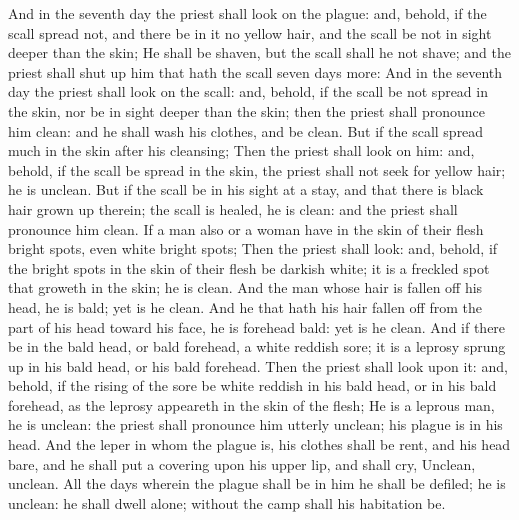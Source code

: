 \begin{biblechapter}
\verse And in the seventh day the priest shall look on the plague: and, behold, if the scall spread not, and there be in it no yellow hair, and the scall be not in sight deeper than the skin;
\verse He shall be shaven, but the scall shall he not shave; and the priest shall shut up him that hath the scall seven days more:
\verse And in the seventh day the priest shall look on the scall: and, behold, if the scall be not spread in the skin, nor be in sight deeper than the skin; then the priest shall pronounce him clean: and he shall wash his clothes, and be clean.
\verse But if the scall spread much in the skin after his cleansing;
\verse Then the priest shall look on him: and, behold, if the scall be spread in the skin, the priest shall not seek for yellow hair; he is unclean.
\verse But if the scall be in his sight at a stay, and that there is black hair grown up therein; the scall is healed, he is clean: and the priest shall pronounce him clean.
\verse If a man also or a woman have in the skin of their flesh bright spots, even white bright spots;
\verse Then the priest shall look: and, behold, if the bright spots in the skin of their flesh be darkish white; it is a freckled spot that groweth in the skin; he is clean.
\verse And the man whose hair is fallen off his head, he is bald; yet is he clean.
\verse And he that hath his hair fallen off from the part of his head toward his face, he is forehead bald: yet is he clean.
\verse And if there be in the bald head, or bald forehead, a white reddish sore; it is a leprosy sprung up in his bald head, or his bald forehead.
\verse Then the priest shall look upon it: and, behold, if the rising of the sore be white reddish in his bald head, or in his bald forehead, as the leprosy appeareth in the skin of the flesh;
\verse He is a leprous man, he is unclean: the priest shall pronounce him utterly unclean; his plague is in his head.
\verse And the leper in whom the plague is, his clothes shall be rent, and his head bare, and he shall put a covering upon his upper lip, and shall cry, Unclean, unclean.
\verse All the days wherein the plague shall be in him he shall be defiled; he is unclean: he shall dwell alone; without the camp shall his habitation be.

\end{biblechapter}
